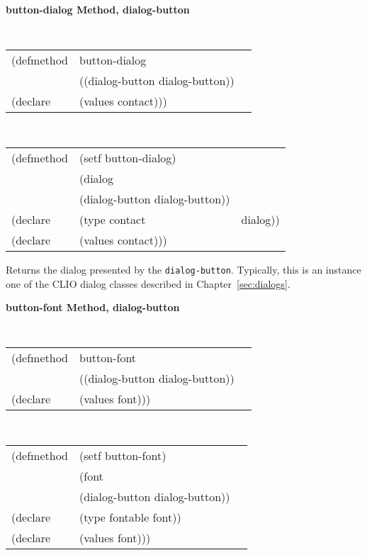 {\samepage  
{\large {\bf button-dialog \hfill Method, dialog-button}}
\begin{flushright} \parbox[t]{6.125in}{
\tt
\begin{tabular}{lll}
\raggedright
(defmethod & button-dialog & \\
& ((dialog-button  dialog-button)) \\
(declare & (values contact)))
\end{tabular}
\rm

}\end{flushright}}

{\samepage
\begin{flushright} \parbox[t]{6.125in}{
\tt
\begin{tabular}{lll}
\raggedright
(defmethod & (setf button-dialog) & \\
         & (dialog \\
         & (dialog-button dialog-button)) \\
(declare &(type contact & dialog))\\
(declare &(values contact)))
\end{tabular}
\rm
}
\end{flushright}}

\begin{flushright} \parbox[t]{6.125in}{
Returns the dialog presented by the {\tt dialog-button}.
Typically, this is an instance one of the CLIO dialog classes described in
Chapter~\ref{sec:dialogs}.}
\end{flushright}

{\samepage  
{\large {\bf button-font \hfill Method, dialog-button}}
\begin{flushright} \parbox[t]{6.125in}{
\tt
\begin{tabular}{lll}
\raggedright
(defmethod & button-font & \\
& ((dialog-button  dialog-button)) \\
(declare & (values font)))
\end{tabular}
\rm

}\end{flushright}}

\begin{flushright} \parbox[t]{6.125in}{
\tt
\begin{tabular}{lll}
\raggedright
(defmethod & (setf button-font) & \\
         & (font \\
         & (dialog-button  dialog-button)) \\
(declare &(type fontable  font))\\
(declare & (values font)))
\end{tabular}
\rm}
\end{flushright}

